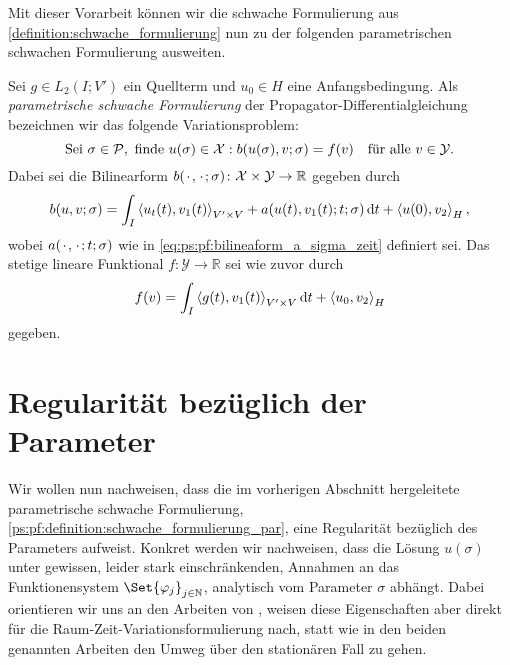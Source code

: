 Mit dieser Vorarbeit können wir die schwache Formulierung aus \cref{definition:schwache_formulierung} nun zu der folgenden parametrischen schwachen Formulierung ausweiten.

\begin{Definition}
\label{def:ps:pf:schwache_formulierung_par}
    Sei $g \in L_{2}(I; V')$ ein Quellterm und $u_{0} \in H$ eine Anfangsbedingung.
    Als \emph{parametrische schwache Formulierung} der Propagator-Differentialgleichung bezeichnen wir das folgende Variationsproblem:
    \begin{equation}
        \label{eq:fette_varprob_sigma_und_so}
        \text{Sei}~\sigma \in \mathcal P,~\text{finde}~u(\sigma) \in \mathcal X : b(u(\sigma), v; \sigma) = f(v) \quad \fa v \in \mathcal Y.
    \end{equation}
    Dabei sei die Bilinearform $b({\mkern2mu\cdot\mkern2mu}, {\mkern2mu\cdot\mkern2mu}; \sigma) \colon \mathcal X \times \mathcal Y \to \mathbb{R}$ gegeben durch
     \begin{equation}
         \label{eq:ps:rzvp:schwache_formulierung_lhs_b_sigma}
         b(u, v; \sigma)
             = \int_{I} \skprod{u_{t}(t)}{v_{1}(t)}_{V' \times V} + a(u(t), v_{1}(t); t; \sigma) \diff t + \skprod{u(0)}{v_{2}}_{H},
     \end{equation}
     wobei $a({\mkern2mu\cdot\mkern2mu}, {\mkern2mu\cdot\mkern2mu}; t; \sigma)$ wie in \cref{eq:ps:pf:bilineaform_a_sigma_zeit} definiert sei.
     Das stetige lineare Funktional $f \colon \mathcal Y \to \mathbb{R}$ sei wie zuvor durch
     \begin{equation}
         \label{eq:ps:rzvp:schwache_formulierung_rhs_f_sigma}
         f(v) = \int_{I} \skprod{g(t)}{v_{1}(t)}_{V' \times V} \diff t + \skprod{u_{0}}{v_{2}}_{H}
     \end{equation}
     gegeben.
\end{Definition}


\section{Regularität bezüglich der Parameter} %
\label{sec:regularit_t_bez_glich_der_parameter}

Wir wollen nun nachweisen, dass die im vorherigen Abschnitt hergeleitete parametrische schwache Formulierung, \cref{ps:pf:definition:schwache_formulierung_par}, eine Regularität bezüglich des Parameters aufweist.
Konkret werden wir nachweisen, dass die Lösung $u(\sigma)$ unter gewissen, leider stark einschränkenden, Annahmen an das Funktionensystem $\Set{\varphi_{j}}_{j \in \mathbb{N}}$, analytisch vom Parameter $\sigma$ abhängt.
Dabei orientieren wir uns an den Arbeiten von \textcite{Cohen:2010kz,Cohen:2011jp,Kunoth:2013ef}, weisen diese Eigenschaften aber direkt für die Raum-Zeit-Variationsformulierung nach, statt wie in den beiden genannten Arbeiten den Umweg über den stationären Fall zu gehen.

